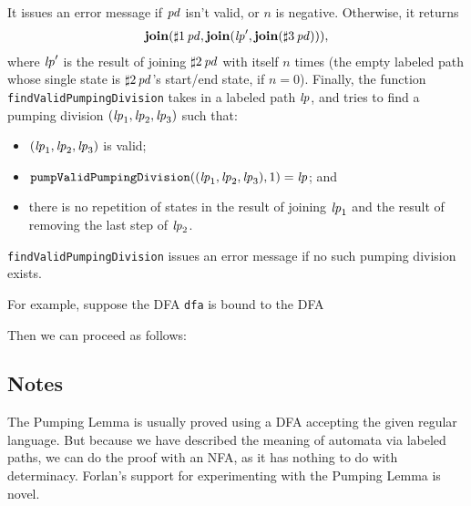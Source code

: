 It issues an error message if ${\it pd}$ isn't valid, or $n$ is negative.
Otherwise, it returns
\begin{gather*}
\mathbf{join}({{\sharp}1}\,{\it pd},\mathbf{join}({\it lp}',\mathbf{join}({{\sharp}3}\,{\it pd}))) ,
\end{gather*}
where ${\it lp}'$ is the result of joining ${{\sharp}2}\,{\it pd}$ with itself $n$
times (the empty labeled path whose single state is ${{\sharp}2}\,{\it pd}$'s
start/end state, if $n=0$).  Finally, the function
\texttt{findValidPumpingDivision} takes in a labeled path ${\it lp}$, and
tries to find a pumping division $({\it lp}_1, {\it lp}_2, {\it lp}_3)$ such that:
\begin{itemize}
\item $({\it lp}_1, {\it lp}_2, {\it lp}_3)$ is valid;

\item $\mathtt{pumpValidPumpingDivision}(({\it lp}_1, {\it lp}_2, {\it lp}_3), 1) = {\it lp}$;
  and

\item there is no repetition of states in the result of joining ${\it lp}_1$ and
  the result of removing the last step of ${\it lp}_2$.
\end{itemize}
\texttt{findValidPumpingDivision} issues an error message if
no such pumping division exists.

For example, suppose the DFA \texttt{dfa} is bound to the
DFA
\begin{center}

\end{center}
Then we can proceed as follows:

%

\subsection{Notes}

The Pumping Lemma is usually proved using a DFA accepting the given
regular language.  But because we have described the meaning of
automata via labeled paths, we can do the proof with an NFA, as it has
nothing to do with determinacy.  Forlan's support for experimenting
with the Pumping Lemma is novel.

